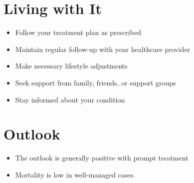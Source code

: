 \section{Living with It}
\begin{itemize}[noitemsep]
  \item Follow your treatment plan as prescribed
  \item Maintain regular follow-up with your healthcare provider
  \item Make necessary lifestyle adjustments
  \item Seek support from family, friends, or support groups
  \item Stay informed about your condition
\end{itemize}
\section{Outlook}
\begin{itemize}[noitemsep]
  \item The outlook is generally positive with prompt treatment
  \item Mortality is low in well-managed cases.
\end{itemize}

